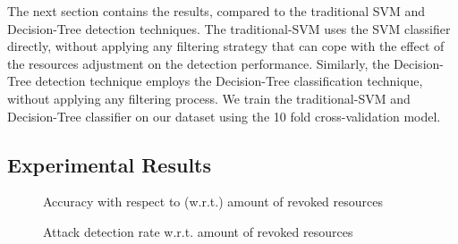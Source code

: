 \documentclass[twocolumn]{bmcart}%
\begin{document}
The next section contains the results, compared to the traditional SVM \cite{han2011data} and Decision-Tree detection \cite{dobra2009decision} techniques. The traditional-SVM uses the SVM classifier directly, without applying any filtering strategy that can cope with the effect of the resources adjustment on the detection performance. Similarly, the Decision-Tree detection technique employs the Decision-Tree classification technique, without applying any filtering process. We train the traditional-SVM and Decision-Tree classifier on our dataset using the 10 fold cross-validation model.

\subsection*{Experimental Results}

\begin{figure}[!ht]
    \label{fig1}
    \caption{Accuracy with respect to (w.r.t.) amount of revoked resources}
\end{figure}

\begin{figure}[!ht]
    \label{fig1}
    \caption{Attack detection rate w.r.t. amount of revoked resources}
\end{figure}
\end{document}
